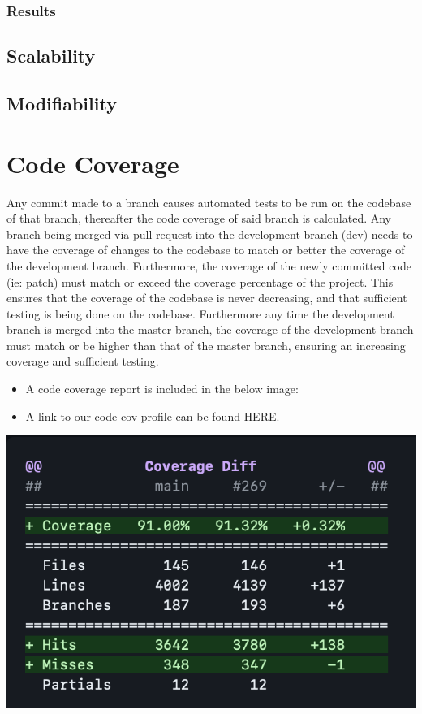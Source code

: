 \documentclass[12pt]{article}
\begin{document}
\subsubsection{Results}
\subsection{Scalability}
\subsection{Modifiability}

\newpage
\section{Code Coverage}
Any commit made to a branch causes automated tests to be run on the codebase of that branch, thereafter the code coverage of said branch is calculated.
Any branch being merged via pull request into the development branch (dev) needs to have the coverage of changes to the codebase to match or better the coverage of the development branch.
Furthermore, the coverage of the newly committed code (ie: patch) must match or exceed the coverage percentage of the project.
This ensures that the coverage of the codebase is never decreasing, and that sufficient testing is being done on the codebase.
Furthermore any time the development branch is merged into the master branch, the coverage of the development branch must match or be higher than that of the master branch, ensuring an increasing coverage and sufficient testing.
\begin{itemize}
    \item A code coverage report is included in the below image:
    \item A link to our code cov profile can be found \href{https://codecov.io/gh/COS301-SE-2023/Domain-Pulse-A-Sentiment-Analysis-Platform}{HERE.}
\end{itemize}
\includegraphics[width=\textwidth]{codecovReport.png}
\end{document}
